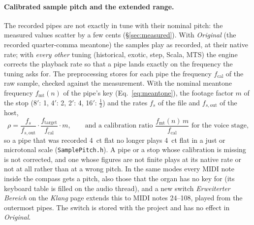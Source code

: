 \documentclass[11pt,a4paper,parskip=half,DIV=11,toc=bibliography]{scrartcl}
\newcommand{\ui}[1]{\emph{#1}}                 %
\newcommand{\fn}[1]{\mbox{\texttt{#1}}}
\begin{document}
\paragraph{Calibrated sample pitch and the extended range.} The recorded pipes are not exactly in tune with their nominal
pitch: the measured values scatter by a few cents (\S\ref{sec:measured}). With \ui{Original} (the recorded quarter-comma
meantone) the samples play as recorded, at their native rate; with \emph{every other} tuning (historical, exotic, step,
Scala, MTS) the engine corrects the playback rate so that a pipe lands exactly on the frequency the tuning asks for. The
preprocessing stores for each pipe the frequency $f_\text{cal}$ of the raw sample, checked against the measurement. With
the nominal meantone frequency $f_\text{mt}(n)$ of the pipe's key (Eq.~\ref{eq:meantone}), the footage factor $m$ of the stop
(8$'$: 1, 4$'$: 2, 2$'$: 4, 16$'$: $\tfrac12$) and the rates $f_{s}$ of the file and $f_{s,\text{out}}$ of the host,
\begin{equation}
  \rho = \frac{f_{s}}{f_{s,\text{out}}}\cdot\frac{f_\text{target}}{f_\text{cal}}\cdot m,
  \qquad\text{and a calibration ratio } \frac{f_\text{mt}(n)\, m}{f_\text{cal}} \text{ for the voice stage,}
\end{equation}
so a pipe that was recorded \SI{4}{ct} flat no longer plays \SI{4}{ct} flat in a just or microtonal scale
(\fn{SamplePitch.h}). A pipe or a stop whose calibration is missing is not corrected, and one whose figures are not
finite plays at its native rate or not at all rather than at a wrong pitch. In the same modes every MIDI note inside the
compass gets a pitch, also those that the organ has no key for (its keyboard table is filled on the audio thread), and a new
switch \ui{Erweiterter Bereich} on the \ui{Klang} page extends this to MIDI notes 24--108, played from the outermost pipes.
The switch is stored with the project and has no effect in \ui{Original}.
\end{document}
